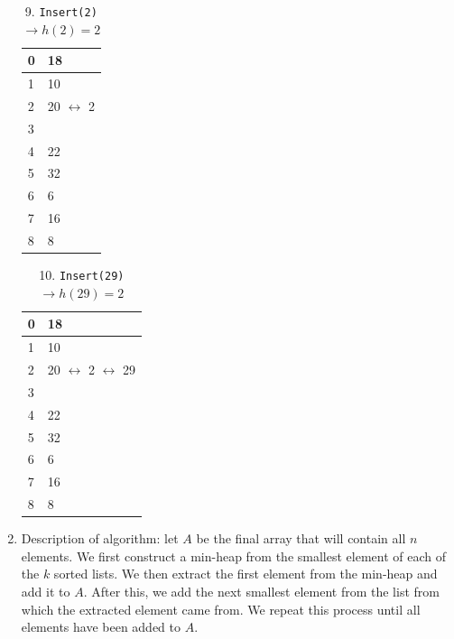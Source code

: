 \documentclass[11pt, letterpaper, titlepage]{article}
\begin{document}
\begin{enumerate}[label=\alph*)]
\begin{paracol}{2}
        \begin{table}[H]
            \small
            \centering
            \caption{9. \texttt{Insert(2)} $\rightarrow h(2) = 2$}
            \begin{tabular}{|m{3em}|m{7em}|}
                \hline
                0 & 18 \\ \hline
                1 & 10 \\ \hline
                2 & 20 $\leftrightarrow$ 2 \\ \hline
                3 &  \\ \hline
                4 & 22 \\ \hline
                5 & 32 \\ \hline
                6 & 6 \\ \hline
                7 & 16 \\ \hline
                8 & 8 \\ \hline
            \end{tabular}
        \end{table}

        \switchcolumn

        \begin{table}[H]
            \small
            \centering
            \caption{10. \texttt{Insert(29)} $\rightarrow h(29) = 2$}
            \begin{tabular}{|m{3em}|m{7em}|}
                \hline
                0 & 18 \\ \hline
                1 & 10 \\ \hline
                2 & 20 $\leftrightarrow$ 2 $\leftrightarrow$ 29 \\ \hline
                3 &  \\ \hline
                4 & 22 \\ \hline
                5 & 32 \\ \hline
                6 & 6 \\ \hline
                7 & 16 \\ \hline
                8 & 8 \\ \hline
            \end{tabular}
        \end{table}
    \end{paracol}

    \item Description of algorithm: let $A$ be the final array that will contain all $n$ elements. We first construct a min-heap from the smallest element of each of the $k$ sorted lists. We then extract the first element from the min-heap and add it to $A$. After this, we add the next smallest element from the list from which the extracted element came from. We repeat this process until all elements have been added to $A$.
    

\end{enumerate}
\end{document}
